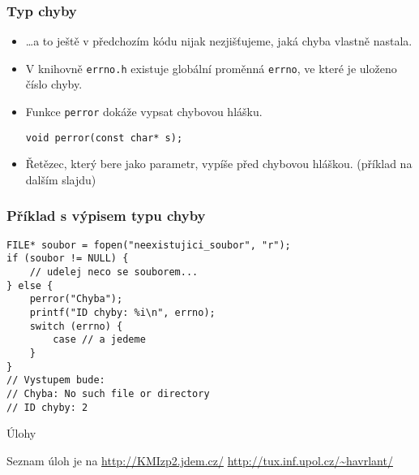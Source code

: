 \documentclass{beamer}
\newenvironment{itemizex}%
  {\large \begin{itemize}%
    \setlength{\itemsep}{8pt}%
    \setlength{\parskip}{8pt}}%
  {\end{itemize}}
\begin{document}
\begin{frame}[t,fragile]\frametitle{Typ chyby} 
    \begin{itemizex}
        \item \dots a to ještě v předchozím kódu nijak nezjišťujeme, jaká chyba vlastně nastala. 
        \item V knihovně \texttt{errno.h} existuje globální proměnná \texttt{errno}, ve které je uloženo číslo chyby. 
        \item Funkce \texttt{perror} dokáže vypsat chybovou hlášku. 
\begin{verbatim} 
void perror(const char* s);
\end{verbatim}
        \item Řetězec, který bere jako parametr, vypíše před chybovou hláškou. (příklad na dalším slajdu)
    \end{itemizex}
\end{frame}


\begin{frame}[t,fragile]\frametitle{Příklad s výpisem typu chyby} 
\begin{verbatim} 
FILE* soubor = fopen("neexistujici_soubor", "r");
if (soubor != NULL) {
    // udelej neco se souborem...
} else {
    perror("Chyba");
    printf("ID chyby: %i\n", errno);
    switch (errno) {
        case // a jedeme
    }
}
// Vystupem bude:
// Chyba: No such file or directory
// ID chyby: 2
\end{verbatim}
\end{frame}


\begin{frame}[t,fragile]{Úlohy}
\begin{center}
\vskip 1cm
{\Large Seznam úloh je na \url{http://KMIzp2.jdem.cz/}}
\vskip 2cm
\url{http://tux.inf.upol.cz/~havrlant/}
\end{center}
\end{frame}
\end{document}

